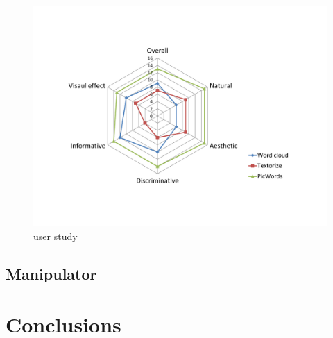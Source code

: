 \documentclass[letter]{sig-alternate}
\begin{document}
\begin{figure}[t]
\begin{center}
\includegraphics[scale=0.35]{figure/baseline2.pdf}
\caption{\small{user study}}
\label{fig:firstfig}
\end{center}
\end{figure}


\subsection{Manipulator}













\section{Conclusions} \label{sec:conclusion}







\scriptsize

\end{document}
